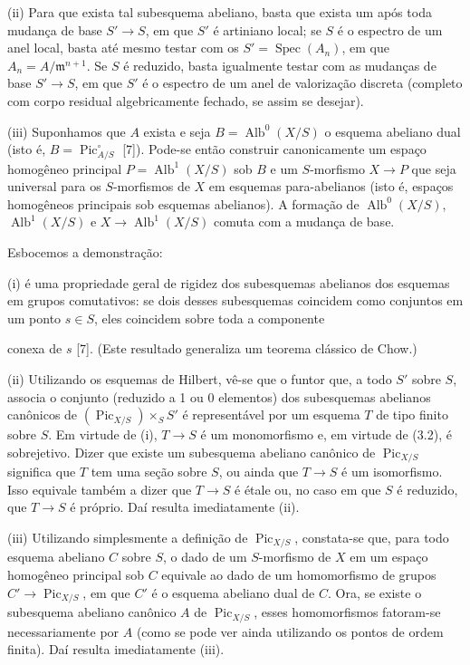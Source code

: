 \documentclass[11pt,twoside,openany]{book}
\numberwithin{equation}{section}
\newcommand{\src}[1]{%
  \phantomsection\hypertarget{src:#1}{}%
  \marginpar{\raggedleft\footnotesize\sffamily #1}%
}
\theoremstyle{plain}
\theoremstyle{definition}
\theoremstyle{remark}
\newcommand{\FgaUnitKey}{frontmatter}
\renewcommand{\src}[1]{%
  \phantomsection\hypertarget{src:\FgaUnitKey:#1}{}%
  \marginpar{\raggedleft\footnotesize\sffamily #1}%
}
\begin{document}
\noindent(ii) Para que exista tal subesquema abeliano, basta que exista um
após toda mudança de base $S'\longrightarrow S$, em que $S'$ é artiniano
local; se $S$ é o espectro de um anel local, basta até mesmo testar com os
$S'=\operatorname{Spec}(A_n)$, em que $A_n=A/\mathfrak m^{n+1}$. Se $S$ é
reduzido, basta igualmente testar com as mudanças de base
$S'\longrightarrow S$, em que $S'$ é o espectro de um anel de valorização
discreta (completo com corpo residual algebricamente fechado, se assim se
desejar).

\noindent(iii) Suponhamos que $A$ exista e seja
$B=\operatorname{Alb}^0(X/S)$ o esquema abeliano dual (isto é,
$B=\operatorname{Pic}_{A/S}^\circ$ [7]). Pode-se então construir
canonicamente um espaço homogêneo principal
$P=\operatorname{Alb}^1(X/S)$ sob $B$ e um $S$-morfismo
$X\longrightarrow P$ que seja universal para os $S$-morfismos de $X$ em
esquemas para-abelianos (isto é, espaços homogêneos principais sob esquemas
abelianos). A formação de $\operatorname{Alb}^0(X/S)$,
$\operatorname{Alb}^1(X/S)$ e
$X\longrightarrow\operatorname{Alb}^1(X/S)$ comuta com a mudança de base.

Esbocemos a demonstração:

(i) é uma propriedade geral de rigidez dos subesquemas abelianos dos esquemas
em grupos comutativos: se dois desses subesquemas coincidem como conjuntos em
um ponto $s\in S$, eles coincidem sobre toda a componente
\src{238}
conexa de $s$ [7]. (Este resultado generaliza um teorema clássico de Chow.)

(ii) Utilizando os esquemas de Hilbert, vê-se que o funtor que, a todo $S'$
sobre $S$, associa o conjunto (reduzido a 1 ou 0 elementos) dos subesquemas
abelianos canônicos de $(\operatorname{Pic}_{X/S})\times_S S'$ é
representável por um esquema $T$ de tipo finito sobre $S$. Em virtude de (i),
$T\longrightarrow S$ é um monomorfismo e, em virtude de (3.2), é
sobrejetivo. Dizer que existe um subesquema abeliano canônico de
$\operatorname{Pic}_{X/S}$ significa que $T$ tem uma seção sobre $S$, ou ainda
que $T\longrightarrow S$ é um isomorfismo. Isso equivale também a dizer que
$T\longrightarrow S$ é étale ou, no caso em que $S$ é reduzido, que
$T\longrightarrow S$ é próprio. Daí resulta imediatamente (ii).

(iii) Utilizando simplesmente a definição de $\operatorname{Pic}_{X/S}$,
constata-se que, para todo esquema abeliano $C$ sobre $S$, o dado de um
$S$-morfismo de $X$ em um espaço homogêneo principal sob $C$ equivale ao dado
de um homomorfismo de grupos
$C'\longrightarrow\operatorname{Pic}_{X/S}$, em que $C'$ é o esquema abeliano
dual de $C$. Ora, se existe o subesquema abeliano canônico $A$ de
$\operatorname{Pic}_{X/S}$, esses homomorfismos fatoram-se necessariamente por
$A$ (como se pode ver ainda utilizando os pontos de ordem finita). Daí resulta
imediatamente (iii).
\end{document}
